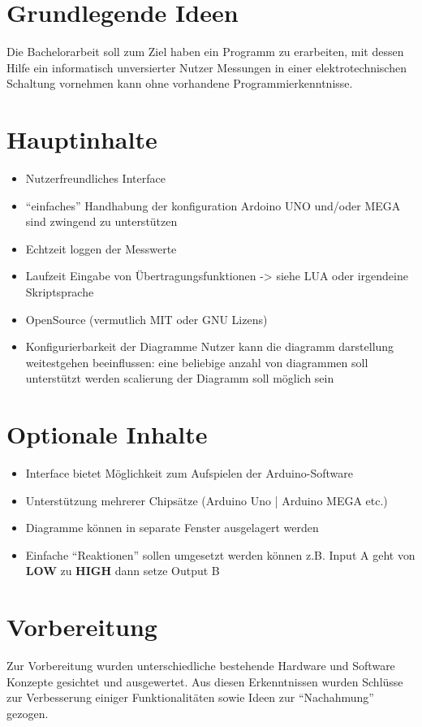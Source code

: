 \section{Grundlegende Ideen}
Die Bachelorarbeit soll zum Ziel haben ein Programm zu erarbeiten, mit dessen
Hilfe ein informatisch unversierter Nutzer Messungen in einer
elektrotechnischen Schaltung vornehmen kann ohne vorhandene
Programmierkenntnisse.

\section{Hauptinhalte}
\begin{itemize}
 \item Nutzerfreundliches Interface
 \item ``einfaches'' Handhabung der konfiguration
  \subitem Ardoino UNO und/oder MEGA sind zwingend zu unterstützen
 \item Echtzeit loggen der Messwerte
 \item Laufzeit Eingabe von Übertragungsfunktionen -> siehe LUA oder irgendeine 
Skriptsprache
 \item OpenSource (vermutlich MIT oder GNU Lizens)
 \item Konfigurierbarkeit der Diagramme
  \subitem Nutzer kann die diagramm darstellung weitestgehen beeinflussen:
    \subsubitem eine beliebige anzahl von diagrammen soll unterstützt werden
    \subsubitem scalierung der Diagramm soll möglich sein
\end{itemize}

\section{Optionale Inhalte}
\begin{itemize}
 \item Interface bietet Möglichkeit zum Aufspielen der Arduino-Software
 \item Unterstützung mehrerer Chipsätze (Arduino Uno | Arduino MEGA etc.)
 \item Diagramme können in separate Fenster ausgelagert werden
 \item Einfache ``Reaktionen'' sollen umgesetzt werden können
  \subitem z.B. Input A geht von \textbf{LOW} zu \textbf{HIGH} dann setze Output 
B
\end{itemize}

\section{Vorbereitung}
Zur Vorbereitung wurden unterschiedliche bestehende Hardware und Software
Konzepte gesichtet und ausgewertet. Aus diesen Erkenntnissen wurden Schlüsse
zur Verbesserung einiger Funktionalitäten sowie Ideen zur ``Nachahmung''
gezogen.

